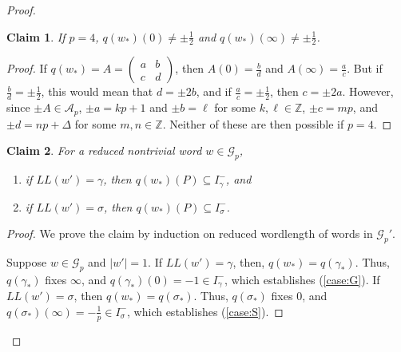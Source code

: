 \documentclass[10pt,a4paper]{amsart}
\newtheorem{claim}{Claim}
\begin{document}
\begin{proof}
\begin{claim}  \label{claim:overlap} If $p = 4$,  $q(w_*)(0) \neq \pm \frac{1}{2}$  and $q(w_*)(\infty) \neq \pm \frac{1}{2}$. 
\end{claim}

\begin{proof}
If $q(w_*) = A = \begin{pmatrix} a & b \\ c & d \end{pmatrix}$, then $A(0) = \frac{b}{d}$ and $A(\infty) = \frac{a}{c}$. But if $\frac{b}{d} = \pm \frac{1}{2}$, this would mean that $d = \pm 2b$, and if $\frac{a}{c} = \pm \frac{1}{2}$, then $c = \pm 2a$. However, since $\pm A \in \mathcal{A}_p$, $\pm a = kp + 1$ and $\pm b = \ell$ for some $k, \ell \in \mathbb{Z}$, $\pm c = mp$, and $\pm d = np + \Delta$ for some $m, n \in \mathbb{Z}$. Neither of these are then possible if $p = 4$.
\end{proof}

\begin{claim} \label{claim:images} For a reduced nontrivial word $w \in \mathcal{G}_p$, 
\begin{enumerate}
\item \label{case:G} if $LL(w') = \gamma$, then $q(w_*)(P) \subseteq I_\gamma^-$, and 
\item \label{case:S} if $LL(w') = \sigma$, then $q(w_*)(P) \subseteq I_\sigma^-$.
\end{enumerate}

\end{claim}

\begin{proof} We prove the claim by induction on reduced wordlength of words in $\mathcal{G}_p'$. 

Suppose $w \in \mathcal{G}_p$ and $|w'|= 1$. If $LL(w') = \gamma$, then, $q(w_*) = q(\gamma_*)$. Thus, $q(\gamma_*)$ fixes $\infty$, and $q(\gamma_*)(0) = -1 \in I_\gamma^-$, which establishes (\ref{case:G}). If $LL(w') = \sigma$, then $q(w_*) = q(\sigma_*)$. Thus, $q(\sigma_*)$ fixes $0$, and $q(\sigma_*)(\infty) = -\frac{1}{p} \in I_\sigma^-$, which establishes (\ref{case:S}).


\end{proof}
\end{proof}
\end{document}
